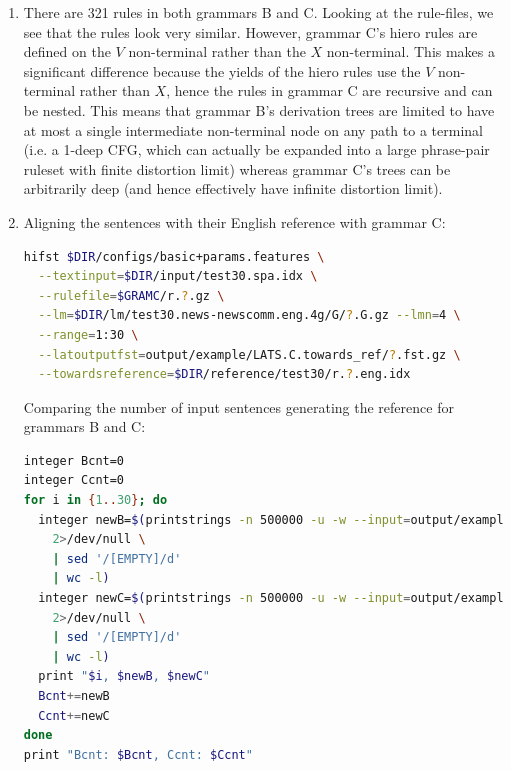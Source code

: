 \documentclass[a4paper,oneside,reqno]{amsart}
\begin{document}
\begin{enumerate}[label=\arabic*.]
  \item There are 321 rules in both grammars B and C. Looking at the
    rule-files, we see that the rules look very similar. However, grammar C's
    hiero rules are defined on the $V$ non-terminal rather than the $X$
    non-terminal. This makes a significant difference because the yields of the
    hiero rules use the $V$ non-terminal rather than $X$, hence the rules in
    grammar C are recursive and can be nested. This means that grammar B's
    derivation trees are limited to have at most a single intermediate
    non-terminal node on any path to a terminal (i.e. a 1-deep CFG, which can
    actually be expanded into a large phrase-pair ruleset with finite
    distortion limit) whereas grammar C's trees can be arbitrarily deep (and
    hence effectively have infinite distortion limit).

  \item
    Aligning the sentences with their English reference with grammar C:
    \begin{lstlisting}[language=bash]
hifst $DIR/configs/basic+params.features \
  --textinput=$DIR/input/test30.spa.idx \
  --rulefile=$GRAMC/r.?.gz \
  --lm=$DIR/lm/test30.news-newscomm.eng.4g/G/?.G.gz --lmn=4 \
  --range=1:30 \
  --latoutputfst=output/example/LATS.C.towards_ref/?.fst.gz \
  --towardsreference=$DIR/reference/test30/r.?.eng.idx
    \end{lstlisting}

    Comparing the number of input sentences generating the reference
    for grammars B and C:
    \begin{lstlisting}[language=bash]
integer Bcnt=0
integer Ccnt=0
for i in {1..30}; do
  integer newB=$(printstrings -n 500000 -u -w --input=output/example/LATS.B.towards_ref/$i.fst.gz \
    2>/dev/null \
    | sed '/[EMPTY]/d'
    | wc -l)
  integer newC=$(printstrings -n 500000 -u -w --input=output/example/LATS.C.towards_ref/$i.fst.gz \
    2>/dev/null \
    | sed '/[EMPTY]/d'
    | wc -l)
  print "$i, $newB, $newC"
  Bcnt+=newB
  Ccnt+=newC
done
print "Bcnt: $Bcnt, Ccnt: $Ccnt"
    \end{lstlisting}


\end{enumerate}
\end{document}
